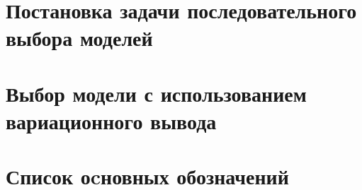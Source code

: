 \documentclass{dissert}
\theoremstyle{definition}
\begin{document}



\tableofcontents{}%

\clearpage

\chapter{Постановка задачи последовательного выбора моделей}


\clearpage
\chapter{Выбор модели с использованием вариационного вывода}

\iffalse
\clearpage


\chapter{Оптимизация гиперпараметров в задаче выбора модели}

\clearpage
\chapter{Выбор субоптимальной структуры модели}


\clearpage
\chapter{Анализ прикладных задач порождения и выбора моделей глубокого обучения}



\clearpage
\addcontentsline{toc}{section}{Заключение}

\fi

\clearpage


\chapter*{Список оcновных обозначений}

\clearpage 
 
\listoffigures

\clearpage
{}
\listoftables

\clearpage

\renewcommand{\bibname}{Список использованных источников}


\end{document}
